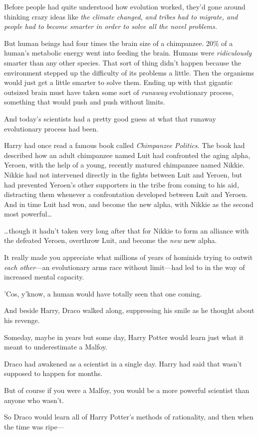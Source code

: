 Before people had quite understood how evolution worked, they’d gone around thinking crazy ideas like \emph{the climate changed, and tribes had to migrate, and people had to become smarter in order to solve all the novel problems.}

But human beings had four times the brain size of a chimpanzee. 20\% of a human’s metabolic energy went into feeding the brain. Humans were \emph{ridiculously} smarter than any other species. That sort of thing didn’t happen because the environment stepped up the difficulty of its problems a little. Then the organisms would just get a little smarter to solve them. Ending up with that gigantic outsized brain must have taken some sort of \emph{runaway} evolutionary process, something that would push and push without limits.

And today’s scientists had a pretty good guess at what that runaway evolutionary process had been.

Harry had once read a famous book called \emph{Chimpanzee Politics.} The book had described how an adult chimpanzee named Luit had confronted the aging alpha, Yeroen, with the help of a young, recently matured chimpanzee named Nikkie. Nikkie had not intervened directly in the fights between Luit and Yeroen, but had prevented Yeroen’s other supporters in the tribe from coming to his aid, distracting them whenever a confrontation developed between Luit and Yeroen. And in time Luit had won, and become the new alpha, with Nikkie as the second most powerful…

…though it hadn’t taken very long after that for Nikkie to form an alliance with the defeated Yeroen, overthrow Luit, and become the \emph{new} new alpha.

It really made you appreciate what millions of years of hominids trying to outwit \emph{each other}—an evolutionary arms race without limit—had led to in the way of increased mental capacity.

’Cos, y’know, a human would have totally seen that one coming.

\later

And beside Harry, Draco walked along, suppressing his smile as he thought about his revenge.

Someday, maybe in years but some day, Harry Potter would learn just what it meant to underestimate a Malfoy.

Draco had awakened as a scientist in a single day. Harry had said that wasn’t supposed to happen for months.

But of course if you were a Malfoy, you would be a more powerful scientist than anyone who wasn’t.

So Draco would learn all of Harry Potter’s methods of rationality, and then when the time was ripe—
